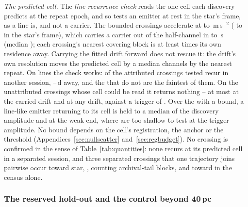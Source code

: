 \emph{The predicted cell.} The \emph{line-recurrence check} reads the one cell
each discovery predicts at the repeat epoch, and so tests an emitter at rest in
the star's frame, as a line is, and not a carrier. The \RcNExcl{} bounded crossings accelerate at \ZtALosLo{} to
\ZtALosHi\,m\,s$^{-2}$ (\EgExStarALosLo{} to \EgStarALosHi{} in the star's
frame), which carries a carrier out of the half-channel in
\ZtLeaveSecLo{} to \ZtLeaveSecHi\,s (median \ZtLeaveSecMed); each crossing's nearest covering block is at
least \ZtGapOverLeaveMin{} times its own residence away. Carrying the fitted
drift forward does not rescue it: the drift's own resolution moves the
predicted cell by a median \ZtRegChanMed{} channels by the nearest repeat. On
lines the check works: \MkAttrRecur{} of the \MkAttrTested{} attributed
crossings tested recur in another session, \QcSepMinD--\QcSepMaxD\,d away,
and the \MkAttrExcl{} that do not are the faintest of them.
On the \RcNExclPoss{} unattributed crossings
whose cell could be read it returns nothing -- at most \RcTMatched{} at the
carried drift and \RcTMax{} at any drift, against a trigger of
\StageNullTrig. Over the \RcNExcl{} with a bound, a line-like emitter returning
to its cell is held to a median \RcFracMed{} of the discovery amplitude and
\RcFracMax{} at the weak end, where \HjNPowerLo{} are too shallow to test at the trigger amplitude. No bound
depends on the cell's registration, the anchor
or the threshold (Appendices~\ref{sec:nullscatter} and~\ref{sec:regbudget}).
\RcNoRepeatSentence No crossing is confirmed in the sense of
Table~\ref{tab:quantities}: none recurs at its predicted cell in a separated
session, and three separated crossings that one trajectory joins pairwise occur
toward \OpNTriAllWord{} star, \OpTriStars, counting archival-tail blocks, and
toward \OpNTriCenWord{} in the census alone.

\subsubsection{The reserved hold-out and the control beyond 40\,pc}
\label{sec:holdoutsearch}

